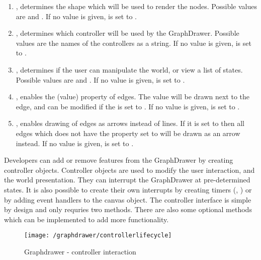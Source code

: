 \begin{enumerate}
    \item {}, determines the shape which will be used to render the nodes. Possible values are  and . If no value is given,  is set to .
    \item {}, determines which controller will be used by the GraphDrawer. Possible values are the names of the controllers as a string. If no value is given,  is set to .
    \item  {}, determines if the user can manipulate the world, or view a list of states. Possible values are  and . If no value is given,  is set to .
    \item {}, enables the  (value) property of edges. The value will be drawn next to the edge, and can be modified if the  is set to . If no value is given,  is set to .
    \item {}, enables drawing of edges as arrows instead of lines. If it is set to  then all edges which does not have the  property set to  will be drawn as an arrow instead. If no value is given,  is set to .
\end{enumerate}
Developers can add or remove features from the GraphDrawer by creating controller objects. Controller objects are used to modify the user interaction, and the world presentation. They can interrupt the GraphDrawer at pre-determined states. It is also possible to create their own interrupts by creating timers (, ) or by adding event handlers to the canvas object. The controller interface is simple by design and only requries two methods. There are also some optional methods which can be implemented to add more functionality.
\begin{figure}[h]
    \centering
    \texttt{[image: /graphdrawer/controllerlifecycle]}
    \caption{Graphdrawer - controller interaction}
    \label{fig:graphdrawerControllerLifeCycle}
\end{figure}
